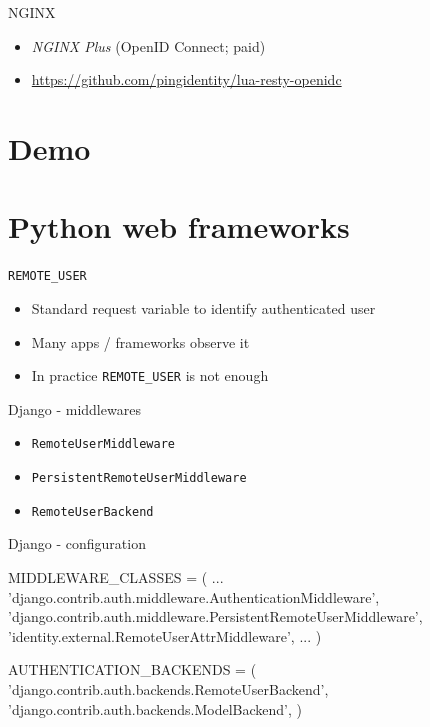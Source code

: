 \documentclass[ignorenonframetext,aspectratio=169]{beamer}
\newenvironment{Shaded}{}{}
\newcommand{\StringTok}[1]{\textcolor[rgb]{0.25,0.44,0.63}{{#1}}}
\newcommand{\OperatorTok}[1]{\textcolor[rgb]{0.40,0.40,0.40}{{#1}}}
\newcommand{\NormalTok}[1]{{#1}}
\providecommand{\tightlist}{%
  \setlength{\itemsep}{0pt}\setlength{\parskip}{0pt}}
\begin{document}
\begin{frame}[fragile]{NGINX}
\begin{itemize}
\tightlist
\item {\em NGINX Plus} (OpenID Connect; paid)
\item \url{https://github.com/pingidentity/lua-resty-openidc}
\end{itemize}
\end{frame}

\section{Demo}

\section{Python web frameworks}

\begin{frame}{\tt REMOTE\_USER}
\begin{itemize}
\tightlist
\item Standard request variable to identify authenticated user
\item Many apps / frameworks observe it
\item In practice {\tt REMOTE\_USER} is not enough
\end{itemize}
\end{frame}

\begin{frame}{Django - middlewares}
\begin{itemize}
\tightlist

\item {\tt RemoteUserMiddleware}
\item {\tt PersistentRemoteUserMiddleware}
\item {\tt RemoteUserBackend}

\end{itemize}
\end{frame}

\begin{frame}[fragile]{Django - configuration}
\begin{Shaded}
\begin{Highlighting}[]
\NormalTok{MIDDLEWARE_CLASSES }\OperatorTok{=} \NormalTok{(}
 \NormalTok{...}
 \StringTok{'django.contrib.auth.middleware.AuthenticationMiddleware'}\NormalTok{,}
 \StringTok{'django.contrib.auth.middleware.PersistentRemoteUserMiddleware'}\NormalTok{,}
 \StringTok{'identity.external.RemoteUserAttrMiddleware'}\NormalTok{,}
 \NormalTok{...}
\NormalTok{)}

\NormalTok{AUTHENTICATION_BACKENDS }\OperatorTok{=} \NormalTok{(}
  \StringTok{'django.contrib.auth.backends.RemoteUserBackend'}\NormalTok{,}
  \StringTok{'django.contrib.auth.backends.ModelBackend'}\NormalTok{,}
\NormalTok{)}
\end{Highlighting}
\end{Shaded}
\end{frame}
\end{document}
